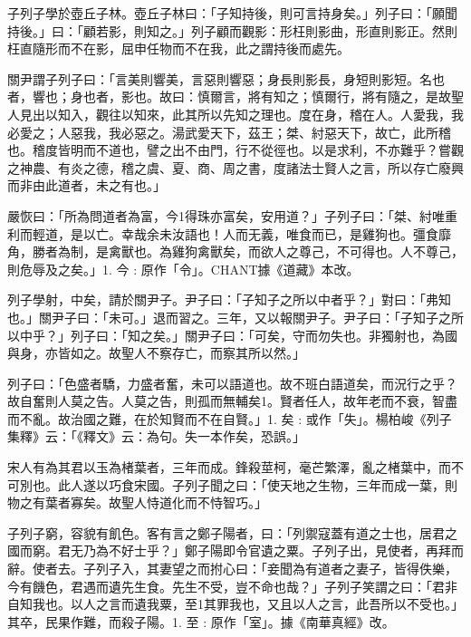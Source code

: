 
\begin{pinyinscope}
子列子學於壺丘子林。壺丘子林曰：「子知持後，則可言持身矣。」列子曰：「願聞持後。」曰：「顧若影，則知之。」列子顧而觀影：形枉則影曲，形直則影正。然則枉直隨形而不在影，屈申任物而不在我，此之謂持後而處先。

關尹謂子列子曰：「言美則響美，言惡則響惡；身長則影長，身短則影短。名也者，響也；身也者，影也。故曰：慎爾言，將有知之；慎爾行，將有隨之，是故聖人見出以知入，觀往以知來，此其所以先知之理也。度在身，稽在人。人愛我，我必愛之；人惡我，我必惡之。湯武愛天下，茲王；桀、紂惡天下，故亡，此所稽也。稽度皆明而不道也，譬之出不由門，行不從徑也。以是求利，不亦難乎？嘗觀之神農、有炎之德，稽之虞、夏、商、周之書，度諸法士賢人之言，所以存亡廢興而非由此道者，未之有也。」

嚴恢曰：「所為問道者為富，今1得珠亦富矣，安用道？」子列子曰：「桀、紂唯重利而輕道，是以亡。幸哉余未汝語也！人而无義，唯食而已，是雞狗也。彊食靡角，勝者為制，是禽獸也。為雞狗禽獸矣，而欲人之尊己，不可得也。人不尊己，則危辱及之矣。」1. 今 : 原作「令」。CHANT據《道藏》本改。

列子學射，中矣，請於關尹子。尹子曰：「子知子之所以中者乎？」對曰：「弗知也。」關尹子曰：「未可。」退而習之。三年，又以報關尹子。尹子曰：「子知子之所以中乎？」列子曰：「知之矣。」關尹子曰：「可矣，守而勿失也。非獨射也，為國與身，亦皆如之。故聖人不察存亡，而察其所以然。」

列子曰：「色盛者驕，力盛者奮，未可以語道也。故不班白語道矣，而況行之乎？故自奮則人莫之告。人莫之告，則孤而無輔矣1。賢者任人，故年老而不衰，智盡而不亂。故治國之難，在於知賢而不在自賢。」1. 矣 : 或作「失」。楊柏峻《列子集釋》云：「《釋文》云：為句。失一本作矣，恐誤。」

宋人有為其君以玉為楮葉者，三年而成。鋒殺莖柯，毫芒繁澤，亂之楮葉中，而不可別也。此人遂以巧食宋國。子列子聞之曰：「使天地之生物，三年而成一葉，則物之有葉者寡矣。故聖人恃道化而不恃智巧。」

子列子窮，容貌有飢色。客有言之鄭子陽者，曰：「列禦寇蓋有道之士也，居君之國而窮。君无乃為不好士乎？」鄭子陽即令官遺之粟。子列子出，見使者，再拜而辭。使者去。子列子入，其妻望之而拊心曰：「妾聞為有道者之妻子，皆得佚樂，今有饑色，君遇而遺先生食。先生不受，豈不命也哉？」子列子笑謂之曰：「君非自知我也。以人之言而遺我粟，至1其罪我也，又且以人之言，此吾所以不受也。」其卒，民果作難，而殺子陽。1. 至 : 原作「室」。據《南華真經》改。


\end{pinyinscope}
